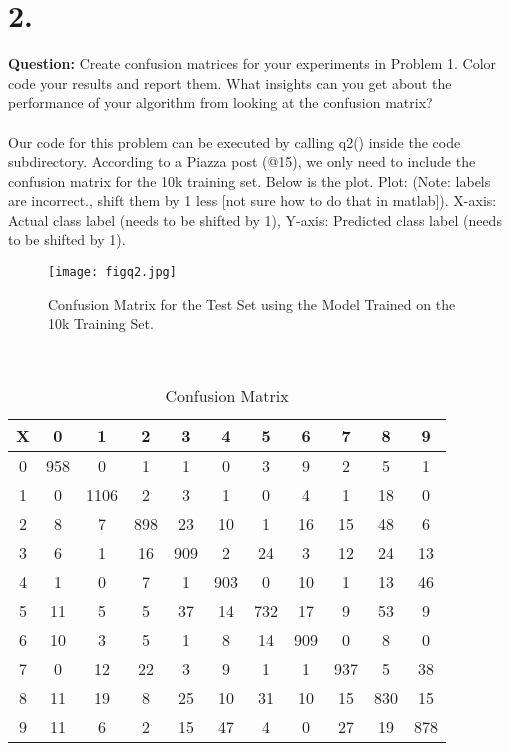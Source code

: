 \documentclass[11pt]{article}
\begin{document}
\section*{2.}
\textbf{Question:} Create confusion matrices for your experiments in Problem 1. Color code your results and report them. What insights can you get about the performance of your algorithm from looking at the confusion matrix?
\\\\
Our code for this problem can be executed by calling q2() inside the code subdirectory. According to a Piazza post (@15), we only need to include the confusion matrix for the 10k training set. Below is the plot. Plot: (Note: labels are incorrect., shift them by 1 less [not sure how to do that in matlab]). X-axis: Actual class label (needs to be shifted by 1), Y-axis: Predicted class label (needs to be shifted by 1).
\begin{figure}[ht!]
\centering
\texttt{[image: figq2.jpg]}
\caption{Confusion Matrix for the Test Set using the Model Trained on the 10k Training Set.}
\label{overflow}
\end{figure}
\\
\begin{table}[ht]
\caption{Confusion Matrix}
\centering
\begin{tabular}{c | c c c c c c c c c c }
\hline\hline
X & 0 & 1 & 2 & 3 & 4 & 5 & 6 & 7 & 8 & 9 \\
\hline
0 & 958 & 0 & 1 & 1 & 0 & 3 & 9 & 2 & 5 & 1 \\
1 & 0 & 1106 & 2 & 3 & 1 & 0 & 4 & 1 & 18 & 0 \\
2 & 8 & 7 & 898 & 23 & 10 & 1 & 16 & 15 & 48 & 6 \\
3 & 6 & 1 & 16 & 909 & 2 & 24 & 3 & 12 & 24 & 13 \\
4 & 1 & 0 & 7 & 1 & 903 & 0 & 10 & 1 & 13 & 46 \\
5 & 11 & 5 & 5 & 37 & 14 & 732 & 17 & 9 & 53 & 9 \\
6 & 10 & 3 & 5 & 1 & 8 & 14 & 909 & 0 & 8 & 0 \\
7 & 0 & 12 & 22 & 3 & 9 & 1 & 1 & 937 & 5 & 38 \\
8 & 11 & 19 & 8 & 25 & 10 & 31 & 10 & 15 & 830 & 15 \\
9 & 11 & 6 & 2 & 15 & 47 & 4 & 0 & 27 & 19 & 878 \\
\end{tabular}
\end{table}
\\\\
\end{document}
